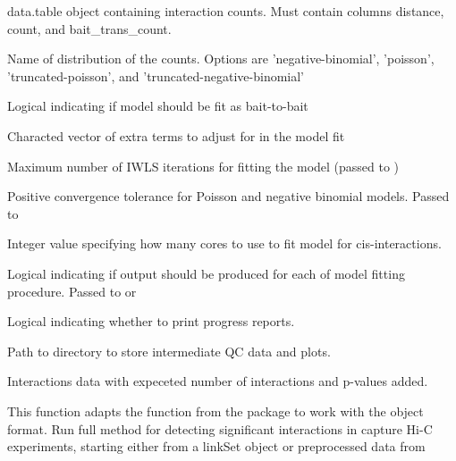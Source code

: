 \documentclass[letterpaper]{book}
\begin{document}
%
\begin{Arguments}
\begin{ldescription}
\item[\code{interaction.data}] data.table object containing interaction counts. Must contain columns distance, count, and bait\_trans\_count.

\item[\code{distribution}] Name of distribution of the counts. Options are 'negative-binomial',
'poisson', 'truncated-poisson', and 'truncated-negative-binomial'

\item[\code{bait.to.bait}] Logical indicating if model should be fit as bait-to-bait

\item[\code{adjustment.terms}] Characted vector of extra terms to adjust for in the model fit

\item[\code{maxit}] Maximum number of IWLS iterations for fitting the model (passed to )

\item[\code{epsilon}] Positive convergence tolerance for Poisson and negative binomial models. Passed to 

\item[\code{cores}] Integer value specifying how many cores to use to fit model for cis-interactions.

\item[\code{trace}] Logical indicating if output should be produced for each of model fitting procedure. Passed to  or 

\item[\code{verbose}] Logical indicating whether to print progress reports.

\item[\code{interim.data.dir}] Path to directory to store intermediate QC data and plots.
\end{ldescription}
\end{Arguments}
%
\begin{Value}
Interactions data with expeceted number of interactions and p-values added.
\end{Value}
%
\begin{Description}
This function adapts the  function from the  package to work with the  object format.
Run full method for detecting significant interactions in capture Hi-C experiments, starting
either from a linkSet object or preprocessed data from 
\end{Description}
\end{document}
